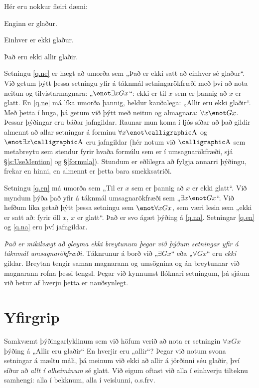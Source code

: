 Hér eru nokkur fleiri dæmi:
	\begin{earg}
		\item[\ex{q.ne}] Enginn er glaður.
		\item[\ex{q.en}] Einhver er ekki glaður.
		\item[\ex{q.na}] Það eru ekki allir glaðir.
	\end{earg}
Setningu \ref{q.ne} er hægt að umorða sem „Það er ekki satt að einhver sé glaður“. Við getum þýtt þessa setningu yfir á táknmál setningarökfræði með því að nota neitun og tilvistarmagnara: „$\enot \exists xGx$“: ekki er til $x$ sem er þannig að $x$ er glatt. En \ref{q.ne} má líka umorða þannig, heldur kauðalega: „Allir eru ekki glaðir“. Með þetta í huga, þá getum við þýtt með neitun og almagnara: $\forall x \enot Gx$. Þessar þýðingar eru báðar jafngildar. Raunar mun koma í ljós síðar að það gildir almennt að allar setningar á forminu $\forall x \enot \meta{A}$ og $\enot \exists x \meta{A}$ eru jafngildar (hér notum við $\meta{A}$ sem metabreytu sem stendur fyrir hvaða formúlu sem er í umsagnarökfræði, sjá \S\ref{s:UseMention} og \S\ref{formula}). Stundum er eðlilegra að fylgja annarri þýðingu, frekar en hinni, en almennt er þetta bara smekksatriði.

Setningu \ref{q.en} má umorða sem „Til er $x$ sem er þannig að $x$ er ekki glatt“. Við myndum þýða það yfir á táknmál umsagnarökfræði sem „$\exists x \enot Gx$“. Við hefðum líka getað þýtt þessa setningu sem $\enot \forall x Gx$, sem væri lesin sem „ekki er satt að: fyrir öll $x$, $x$ er glatt“. Það er svo ágæt þýðing á \ref{q.na}. Setningar \ref{q.en} og \ref{q.na} eru því jafngildar.

\emph{Það er mikilvægt að gleyma ekki breytunum þegar við þýðum setningar yfir á táknmál umsagnarökfræði.} Táknrunur á borð við „$\exists Gx$“ eða „$\forall Gx$“ eru \emph{ekki} gildar. Breytan tengir saman magnarann og umsögnina og án breytunnar við magnarann rofna þessi tengsl. Þegar við kynnumst flóknari setningum, þá sjáum við betur af hverju þetta er nauðsynlegt.

\section{Yfirgrip} \label{yfirgrip}
Samkvæmt þýðingarlyklinum sem við höfum verið að nota er setningin $\forall x Gx$ þýðing á „Allir eru glaðir“ En hverjir eru „allir“? Þegar við notum svona setningar á mæltu máli, þá meinum við ekki að allir á jörðinni séu glaðir, því síður að \emph{allt í alheiminum} sé glatt. Við eigum oftast við alla í einhverju tilteknu samhengi: alla í bekknum, alla í veislunni, o.s.frv.

